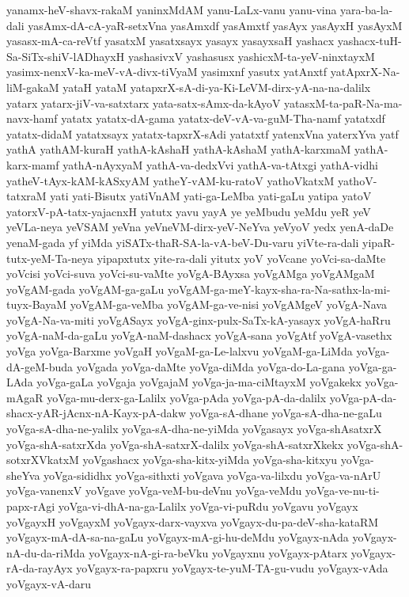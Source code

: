 {yanamx-heV-shavx-rakaM
yaninxMdAM
yanu-LaLx-vanu
yanu-vina
yara-ba-la-dali
yasAmx-dA-cA-yaR-setxVna
yasAmxdf
yasAmxtf
yasAyx
yasAyxH
yasAyxM
yasasx-mA-ca-reVtf
yasatxM
yasatxsayx
yasayx
yasayxsaH
yashacx
yashacx-tuH-Sa-SiTx-shiV-lADhayxH
yashasivxV
yashasusx
yashicxM-ta-yeV-ninxtayxM
yasimx-nenxV-ka-meV-vA-divx-tiVyaM
yasimxnf
yasutx
yatAnxtf
yatApxrX-Na-liM-gakaM
yataH
yataM
yatapxrX-sA-di-ya-Ki-LeVM-dirx-yA-na-na-dalilx
yatarx
yatarx-jiV-va-satxtarx
yata-satx-sAmx-da-kAyoV
yatasxM-ta-paR-Na-ma-navx-hamf
yatatx
yatatx-dA-gama
yatatx-deV-vA-va-guM-Tha-namf
yatatxdf
yatatx-didaM
yatatxsayx
yatatx-tapxrX-sAdi
yatatxtf
yatenxVna
yaterxYva
yatf
yathA
yathAM-kuraH
yathA-kAshaH
yathA-kAshaM
yathA-karxmaM
yathA-karx-mamf
yathA-nAyxyaM
yathA-va-dedxVvi
yathA-va-tAtxgi
yathA-vidhi
yatheV-tAyx-kAM-kASxyAM
yatheY-vAM-ku-ratoV
yathoVkatxM
yathoV-tatxraM
yati
yati-Bisutx
yatiVnAM
yati-ga-LeMba
yati-gaLu
yatipa
yatoV
yatorxV-pA-tatx-yajacnxH
yatutx
yavu
yayA
ye
yeMbudu
yeMdu
yeR
yeV
yeVLa-neya
yeVSAM
yeVna
yeVneVM-dirx-yeV-NeYva
yeVyoV
yedx
yenA-daDe
yenaM-gada
yf
yiMda
yiSATx-thaR-SA-la-vA-beV-Du-varu
yiVte-ra-dali
yipaR-tutx-yeM-Ta-neya
yipapxtutx
yite-ra-dali
yitutx
yoV
yoVcane
yoVci-sa-daMte
yoVcisi
yoVci-suva
yoVci-su-vaMte
yoVgA-BAyxsa
yoVgAMga
yoVgAMgaM
yoVgAM-gada
yoVgAM-ga-gaLu
yoVgAM-ga-meY-kayx-sha-ra-Na-sathx-la-mi-tuyx-BayaM
yoVgAM-ga-veMba
yoVgAM-ga-ve-nisi
yoVgAMgeV
yoVgA-Nava
yoVgA-Na-va-miti
yoVgASayx
yoVgA-ginx-pulx-SaTx-kA-yasayx
yoVgA-haRru
yoVgA-naM-da-gaLu
yoVgA-naM-dashacx
yoVgA-sana
yoVgAtf
yoVgA-vasethx
yoVga
yoVga-Barxme
yoVgaH
yoVgaM-ga-Le-lalxvu
yoVgaM-ga-LiMda
yoVga-dA-geM-buda
yoVgada
yoVga-daMte
yoVga-diMda
yoVga-do-La-gana
yoVga-ga-LAda
yoVga-gaLa
yoVgaja
yoVgajaM
yoVga-ja-ma-ciMtayxM
yoVgakekx
yoVga-mAgaR
yoVga-mu-derx-ga-Lalilx
yoVga-pAda
yoVga-pA-da-dalilx
yoVga-pA-da-shacx-yAR-jAcnx-nA-Kayx-pA-dakw
yoVga-sA-dhane
yoVga-sA-dha-ne-gaLu
yoVga-sA-dha-ne-yalilx
yoVga-sA-dha-ne-yiMda
yoVgasayx
yoVga-shAsatxrX
yoVga-shA-satxrXda
yoVga-shA-satxrX-dalilx
yoVga-shA-satxrXkekx
yoVga-shA-sotxrXVkatxM
yoVgashacx
yoVga-sha-kitx-yiMda
yoVga-sha-kitxyu
yoVga-sheYva
yoVga-sididhx
yoVga-sithxti
yoVgava
yoVga-va-lilxdu
yoVga-va-nArU
yoVga-vanenxV
yoVgave
yoVga-veM-bu-deVnu
yoVga-veMdu
yoVga-ve-nu-ti-papx-rAgi
yoVga-vi-dhA-na-ga-Lalilx
yoVga-vi-puRdu
yoVgavu
yoVgayx
yoVgayxH
yoVgayxM
yoVgayx-darx-vayxva
yoVgayx-du-pa-deV-sha-kataRM
yoVgayx-mA-dA-sa-na-gaLu
yoVgayx-mA-gi-hu-deMdu
yoVgayx-nAda
yoVgayx-nA-du-da-riMda
yoVgayx-nA-gi-ra-beVku
yoVgayxnu
yoVgayx-pAtarx
yoVgayx-rA-da-rayAyx
yoVgayx-ra-papxru
yoVgayx-te-yuM-TA-gu-vudu
yoVgayx-vAda
yoVgayx-vA-daru
}
